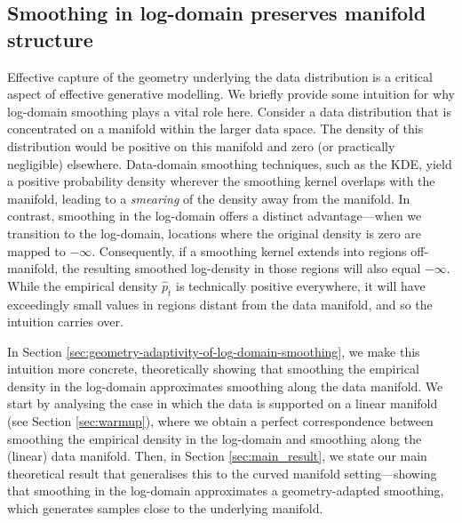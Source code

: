 \documentclass[10pt]{article}
\theoremstyle{plain}
\theoremstyle{definition}
\theoremstyle{remark}
\begin{document}
\subsection{Smoothing in log-domain preserves manifold structure }\label{sec:preserves}
Effective capture of the geometry underlying the data distribution is a critical aspect of effective generative modelling. We briefly provide some intuition for why log-domain smoothing plays a vital role here. Consider a data distribution that is concentrated on a manifold within the larger data space. The density of this distribution would be positive on this manifold and zero (or practically negligible) elsewhere. Data-domain smoothing techniques, such as the KDE, yield a positive probability density wherever the smoothing kernel overlaps with the manifold, leading to a \textit{smearing} of the density away from the manifold.
In contrast, smoothing in the log-domain offers a distinct advantage—when we transition to the log-domain, locations where the original density is zero are mapped to $-\infty$. Consequently, if a smoothing kernel extends into regions off-manifold, the resulting smoothed log-density in those regions will also equal $-\infty$. While the empirical density  $\hat{p}_t$ is technically positive everywhere, it will have exceedingly small values in regions distant from the data manifold, and so the intuition carries over.

In Section \ref{sec:geometry-adaptivity-of-log-domain-smoothing}, we make this intuition more concrete, theoretically showing that smoothing the empirical density in the log-domain approximates smoothing along the data manifold. We start by analysing the case in which the data is supported on a linear manifold (see Section \ref{sec:warmup}), where we obtain a perfect correspondence between smoothing the empirical density in the log-domain and smoothing along the (linear) data manifold. Then, in Section \ref{sec:main_result}, we state our main theoretical result that generalises this to the curved manifold setting—showing that smoothing in the log-domain approximates a geometry-adapted smoothing, which generates samples close to the underlying manifold.
\end{document}
